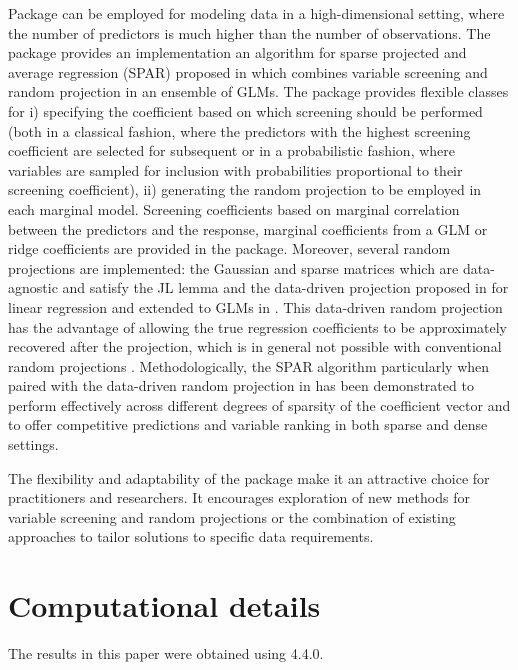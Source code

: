 \documentclass[
  article]{jss}
\begin{document}
Package  can be employed for modeling data in a
high-dimensional setting, where the number of predictors is much higher
than the number of observations. The package provides an implementation
an algorithm for sparse projected and average regression (SPAR) proposed
in \citet{parzer2024glms} which combines variable screening and random
projection in an ensemble of GLMs. The package provides flexible classes
for i) specifying the coefficient based on which screening should be
performed (both in a classical fashion, where the predictors with the
highest screening coefficient are selected for subsequent or in a
probabilistic fashion, where variables are sampled for inclusion with
probabilities proportional to their screening coefficient), ii)
generating the random projection to be employed in each marginal model.
Screening coefficients based on marginal correlation between the
predictors and the response, marginal coefficients from a GLM or ridge
coefficients are provided in the package. Moreover, several random
projections are implemented: the Gaussian and sparse matrices which are
data-agnostic and satisfy the JL lemma and the data-driven projection
proposed in \citet{parzer2024sparse} for linear regression and extended
to GLMs in \citet{parzer2024glms}. This data-driven random projection
has the advantage of allowing the true regression coefficients to be
approximately recovered after the projection, which is in general not
possible with conventional random projections
\citep{Thanei2017RPforHDR}. Methodologically, the SPAR algorithm
particularly when paired with the data-driven random projection in
\citet{parzer2024glms} has been demonstrated to perform effectively
across different degrees of sparsity of the coefficient vector and to
offer competitive predictions and variable ranking in both sparse and
dense settings.

The flexibility and adaptability of the  package make it an
attractive choice for practitioners and researchers. It encourages
exploration of new methods for variable screening and random projections
or the combination of existing approaches to tailor solutions to
specific data requirements.

\section*{Computational details}\label{computational-details}

The results in this paper were obtained using  4.4.0.
\end{document}
